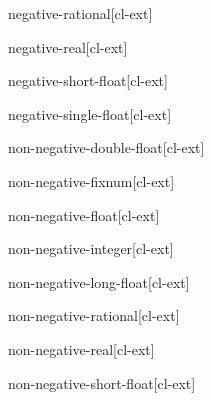 \documentclass[10pt,english]{book}
\begin{document}
\begin{type}{negative-rational}{}[cl-ext]
  
\end{type}

\begin{type}{negative-real}{}[cl-ext]
  
\end{type}

\begin{type}{negative-short-float}{}[cl-ext]
  
\end{type}

\begin{type}{negative-single-float}{}[cl-ext]
  
\end{type}

\begin{type}{non-negative-double-float}{}[cl-ext]
  
\end{type}

\begin{type}{non-negative-fixnum}{}[cl-ext]
  
\end{type}

\begin{type}{non-negative-float}{}[cl-ext]
  
\end{type}

\begin{type}{non-negative-integer}{}[cl-ext]
  
\end{type}

\begin{type}{non-negative-long-float}{}[cl-ext]
  
\end{type}

\begin{type}{non-negative-rational}{}[cl-ext]
  
\end{type}

\begin{type}{non-negative-real}{}[cl-ext]
  
\end{type}

\begin{type}{non-negative-short-float}{}[cl-ext]
  
\end{type}
\end{document}
